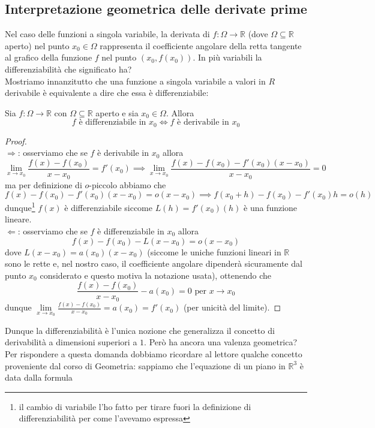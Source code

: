 \subsection{Interpretazione geometrica delle derivate prime}
Nel caso delle funzioni a singola variabile, la derivata di $f: \Omega \to \mathbb{R}$ (dove $\Omega \subseteq \mathbb{R}$ aperto) nel punto $x_0 \in \Omega$ rappresenta il coefficiente angolare della retta tangente al grafico della funzione $f$ nel punto $(x_0, f(x_0))$. In più variabili la differenziabilità che significato ha? \\
Mostriamo innanzitutto che una funzione a singola variabile a valori in $R$ derivabile è equivalente a dire che essa è differenziabile:
\begin{prop}
Sia $f: \Omega \to \mathbb{R}$ con $\Omega \subseteq \mathbb{R}$ aperto e sia $x_0 \in \Omega$. Allora
$$
f \text{ è differenziabile in } x_0 \iff f \text{ è derivabile in }x_0
$$
\end{prop}
\begin{proof} \hspace{1em} \\
$\boxed{\Rightarrow}$: osserviamo che se $f$ è derivabile in $x_0$ allora
$$
\lim_{x \to x_0} \frac{f(x)-f(x_0)}{x-x_0} = f'(x_0) \implies \lim_{x \to x_0} \frac{f(x) - f(x_0) - f'(x_0)(x-x_0)}{x-x_0} = 0
$$
ma per definizione di $o$-piccolo abbiamo che
$$
f(x)-f(x_0) - f'(x_0)(x-x_0) = o(x-x_0) \implies f(x_0 + h) - f(x_0) - f'(x_0)h = o(h)
$$
dunque\footnote{il cambio di variabile l'ho fatto per tirare fuori la definizione di differenziabilità per come l'avevamo espressa} $f(x)$ è differenziabile siccome $L(h)=f'(x_0)(h)$ è una funzione lineare. \\
$\boxed{\Leftarrow}$: osserviamo che se $f$ è differenziabile in $x_0$ allora
$$
f(x) - f(x_0) - L(x-x_0) = o(x-x_0)
$$
dove $L(x-x_0) = a(x_0)(x-x_0)$ (siccome le uniche funzioni lineari in $\mathbb{R}$ sono le rette e, nel nostro caso, il coefficiente angolare dipenderà sicuramente dal punto $x_0$ considerato e questo motiva la notazione usata), ottenendo che
$$
\frac{f(x)-f(x_0)}{x-x_0} - a(x_0) = 0 \text{ per } x \to x_0
$$
dunque $\lim\limits_{x \to x_0} \frac{f(x)-f(x_0)}{x-x_0} = a(x_0) = f'(x_0)$ (per unicità del limite).
\end{proof}
Dunque la differenziabilità è l'unica nozione che generalizza il concetto di derivabilità a dimensioni superiori a $1$. Però ha ancora una valenza geometrica? \\
Per rispondere a questa domanda dobbiamo ricordare al lettore qualche concetto proveniente dal corso di Geometria: sappiamo che l'equazione di un piano in $\mathbb{R}^3$ è data dalla formula
